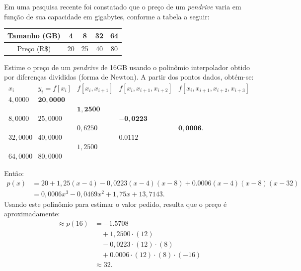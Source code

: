 \documentclass[12pt,a4paper]{article}
\begin{document}
\begin{ExerciseList}
\Exercise[title={2,0}]
Em uma pesquisa recente foi constatado que o preço de um \textit{pendrive} varia em função de sua capacidade em gigabytes, conforme a tabela a seguir:
\medskip
\begin{center}
\begin{tabular}{|c|c|c|c|c|}
\hline			
Tamanho (GB) & 4 & 8 & 32 & 64 \\ 
\hline			
Preço (R\$) & 20 & 25 & 40 & 80 \\
\hline			
\end{tabular}
\end{center}\medskip
Estime o preço de um \textit{pendrive} de 16GB usando o polinômio interpolador obtido por diferenças divididas (forma de Newton).
\Answer A partir dos pontos dados, obtém-se:
\[
	\begin{array}{cccccc}
   x_i & y_i=f[x_i] & f[x_i,x_{i+1}] & f[x_i,x_{i+1},x_{i+2}]  & f[x_i,x_{i+1},x_{i+2},x_{i+3}] \\
   4,0000 & \mathbf{20,0000} \\
	    &            & \mathbf{1,2500} \\
   8,0000 & 25,0000 &             & \mathbf{-0,0223}\\
	    &            & 0,6250 &              & \mathbf{0,0006}. \\
  32,0000 & 40,0000 &             & 0.0112\\
	    &            & 1,2500 \\
  64,0000 & 80,0000
	\end{array}
\]

Então:
\begin{align*}
p(x)
&=20
 +1,25(x-4)
 -0,0223(x-4)(x-8)
 +0.0006(x-4)(x-8)(x-32)\\
& = 0,0006x^3 - 0,0469x^2 + 1,75x + 13,7143.
\end{align*}
Usando este polinômio para estimar o valor pedido, resulta que o preço é aproximadamente:
\begin{align*}
\approx p(16)
& =-1.5708\\
& \quad +1,2500\cdot(12)\\
& \quad -0,0223\cdot(12)\cdot(8)\\
& \quad +0.0006\cdot(12)\cdot(8)\cdot(-16)\\
& \approx 32.
\end{align*}


\end{ExerciseList}
\end{document}
